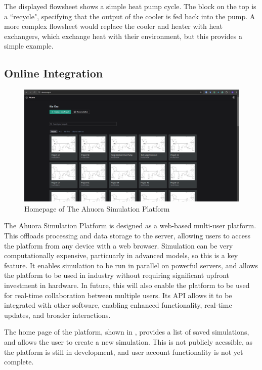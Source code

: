 The displayed flowsheet shows a simple heat pump cycle. The block on the top is a ``recycle", specifying that the output of the cooler is fed back into the pump. A more complex flowsheet would replace the cooler and heater with heat exchangers, which exchange heat with their environment, but this provides a simple example.

\subsection{Online Integration}

\begin{figure}
    \centering
    \includegraphics[width=\textwidth]{platform_homepage.png}
    \caption{Homepage of The Ahuora Simulation Platform}
    \label{fig:homepage}
\end{figure}

The Ahuora Simulation Platform is designed as a web-based multi-user platform. This offloads processing and data storage to the server, allowing users to access the platform from any device with a web browser. Simulation can be very computationally expensive, particuarly in advanced models, so this is a key feature. It enables simulation to be run in parallel on powerful servers, and allows the platform to be used in industry without requiring significant upfront investment in hardware. In future, this will also enable the platform to be used for real-time collaboration between multiple users. Its API allows it to be integrated with other software, enabling enhanced functionality, real-time updates, and broader interactions.

The home page of the platform, shown in , provides a list of saved simulations, and allows the user to create a new simulation. This is not publicly acessible, as the platform is still in development, and user account functionality is not yet complete.

